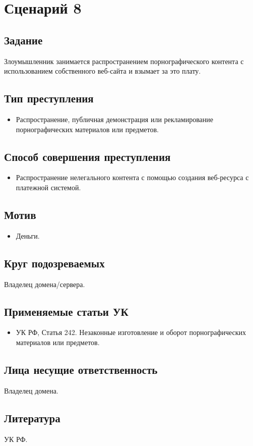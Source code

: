 \section*{Сценарий 8}

\subsection*{Задание}
Злоумышленник занимается распространением порнографического контента с
использованием собственного веб-сайта и взымает за это плату.

\subsection*{Тип преступления}
\begin{itemize}
  \item Распространение, публичная демонстрация или рекламирование
    порнографических материалов или предметов.
\end{itemize}

\subsection*{Способ совершения преступления}
\begin{itemize}
  \item Распространение нелегального контента с помощью создания веб-ресурса с
    платежной системой.
\end{itemize}

\subsection*{Мотив}
\begin{itemize}
  \item Деньги.
\end{itemize}

\subsection*{Круг подозреваемых}
Владелец домена/сервера. 

\subsection*{Применяемые статьи УК}
\begin{itemize}
  \item УК РФ, Статья 242. Незаконные изготовление и оборот порнографических
    материалов или предметов.
\end{itemize}

\subsection*{Лица несущие ответственность}
Владелец домена.

\subsection*{Литература} УК РФ.
